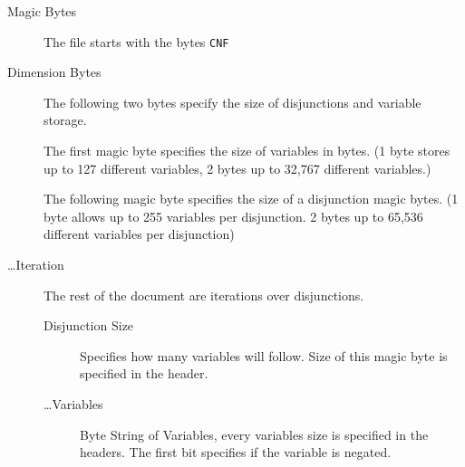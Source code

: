 \documentclass[12pt, letterpaper]{article}
\begin{document}
    \begin{description}
		\item[Magic Bytes] {
        	The file starts with the bytes \texttt{CNF}
        }
		\item[Dimension Bytes] {
			The following two bytes specify the size of
			disjunctions and variable storage.

        	The first magic byte specifies the size of
			variables in bytes. (1 byte stores up to 127
			different variables, 2 bytes up to 32,767 
			different variables.)

			The following magic byte specifies the size
			of a disjunction magic bytes. (1 byte allows
			up to 255 variables per disjunction. 2 bytes
			up to 65,536 different variables per
			disjunction)
        }

		\item[\ldots Iteration] {
			The rest of the document are iterations over
			disjunctions.

			\begin{description}
				\item[Disjunction Size] {
					Specifies how many variables will
					follow. Size of this magic byte is
					specified in the header.
				} 
				\item[\ldots Variables] {
					Byte String of Variables, every
					variables size is specified in the
					headers. The first bit specifies if
					the variable is negated.
				} 
			\end{description}
        }
    \end{description}

	
\end{document}
